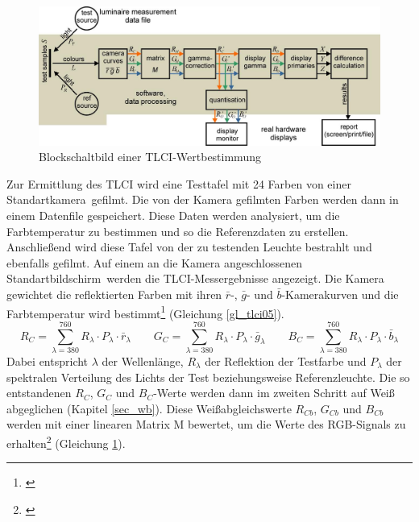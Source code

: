 \begin{figure}[htp]     %
\centering
\includegraphics[width=1.0\textwidth]{bilder/tlci1} 
\caption {Blockschaltbild einer TLCI-Wertbestimmung \protect\footnotemark}\label{b_tlci1}
\end{figure}
\noindent Zur Ermittlung des TLCI wird eine Testtafel mit 24 Farben von einer \glqq Standartkamera\grqq\ gefilmt. Die von der Kamera gefilmten Farben werden dann in einem Datenfile gespeichert. Diese Daten werden analysiert, um die Farbtemperatur zu bestimmen und so die Referenzdaten zu erstellen. Anschließend wird diese Tafel von der zu testenden Leuchte bestrahlt und ebenfalls gefilmt. Auf einem an die Kamera angeschlossenen \glqq Standartbildschirm\grqq\ werden die TLCI-Messergebnisse angezeigt. Die Kamera gewichtet die reflektierten Farben mit ihren $\bar{r}$-, $\bar{g}$- und $\bar{b}$-Kamerakurven und die Farbtemperatur wird bestimmt\footnote{\cite[16]{roberts}} (Gleichung \ref{gl_tlci05}).
\begin{equation}\label{gl_tlci05}
R_{C}=\sum_{\lambda=380}^{760} R_{\lambda} \cdot P_{\lambda} \cdot \bar{r}_{\lambda} \qquad G_{C}=\sum_{\lambda=380}^{760} R_{\lambda} \cdot P_{\lambda} \cdot \bar{g}_{\lambda} \qquad B_{C}=\sum_{\lambda=380}^{760} R_{\lambda} \cdot P_{\lambda} \cdot \bar{b}_{\lambda}
\end{equation}
Dabei entspricht $\lambda$ der Wellenlänge, $R_{\lambda}$ der Reflektion der Testfarbe und $P_{\lambda}$ der spektralen Verteilung des Lichts der Test beziehungsweise Referenzleuchte.
\newpage
\noindent Die so entstandenen $R_{C}$, $G_{C}$ und $B_{C}$-Werte werden dann im zweiten Schritt auf Weiß abgeglichen (Kapitel \ref{sec_wb}). Diese Weißabgleichswerte $R_{Cb}$, $G_{Cb}$ und $B_{Cb}$ werden mit einer linearen Matrix M bewertet, um die Werte des RGB-Signals zu erhalten\footnote{\cite[16]{roberts}} (Gleichung \ref{b_tlci1}).
